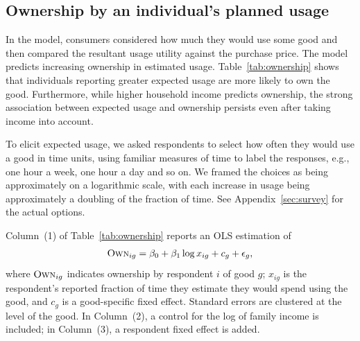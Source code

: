 \documentclass[12pt]{article}
\begin{document}
\subsection{Ownership by an individual's planned usage} 
In the model, consumers considered how much they would use some good and then compared the resultant usage utility against the purchase price. 
The model predicts increasing ownership in estimated usage.
Table~\ref{tab:ownership} shows that individuals reporting greater expected usage are more likely to own the good.
Furthermore, while higher household income predicts ownership, the strong association between expected usage and ownership persists even after taking income into account.

To elicit expected usage, we asked respondents to select how often they would use a good in time units, using familiar measures of time to label the responses, e.g., one hour a week, one hour a day and so on.
We framed the choices as being approximately on a logarithmic scale, with each increase in usage being approximately a doubling of the fraction of time.
See Appendix~\ref{sec:survey} for the actual options.

Column~(1) of Table~\ref{tab:ownership} reports an OLS estimation of 
\begin{align} \label{eq:base_own}
\textsc{Own}_{ig} = \beta_0 + \beta_1 \log x_{ig} + c_{g} + \epsilon_{g}, 
\end{align}
where $\textsc{Own}_{ig}$ indicates ownership by respondent $i$ of good $g$; 
$x_{ig}$ is the respondent's reported fraction of time they estimate they would spend using the good, and $c_g$ is a good-specific fixed effect.
Standard errors are clustered at the level of the good. 
In Column~(2), a control for the log of family income is included;
in Column~(3), a respondent fixed effect is added. 
\end{document}
